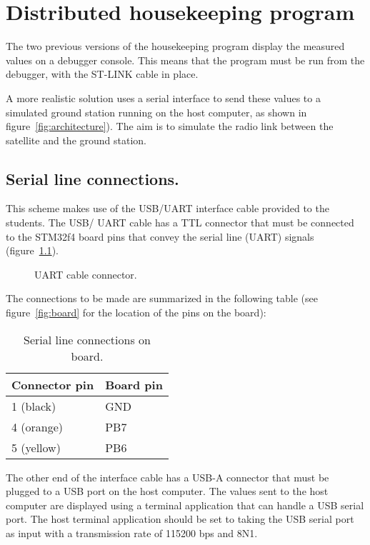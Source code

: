 \chapter{Distributed housekeeping program}\label{ch:Assignment5}

The two previous versions of the housekeeping program display the measured values on a debugger console. This means that the program must be run from the debugger, with the ST-LINK cable in place.

A more realistic solution uses a serial interface to send these values to a simulated ground station running on the host computer, as shown in figure~\ref{fig:architecture}). The aim is to simulate the radio link between the satellite and the ground station.

\section{Serial line connections.}\label{sc:serial}

This scheme makes use of the USB/UART interface cable provided to the students. The USB/ UART cable has a TTL connector that must be connected to the STM32f4 board pins that convey the serial line (UART) signals (figure~\ref{fig:cable}).

\begin{figure}[h]
            \caption{UART cable connector.}
            \label{fig:cable}
\end{figure}

The connections to be made are summarized in the following table (see figure~\ref{fig:board} for the location of the pins on the board):

\begin{table}[htb]
\begin{center}
\begin{tabular}{ll} \hline
Connector pin & Board pin \\ \hline
1 (black) & GND \\
4 (orange) & PB7 \\
5 (yellow) & PB6 \\ \hline
\end{tabular}
\caption{Serial line connections on board.}
\label{tb:connections}
\end{center}
\end{table}

The other end of the interface cable has a USB-A connector that must be plugged to a USB port on the host computer. The values sent to the host computer are displayed using a terminal application that can handle a USB serial port. The host terminal application should be set to taking the USB serial port as input with a transmission rate of 115200 bps and 8N1.

